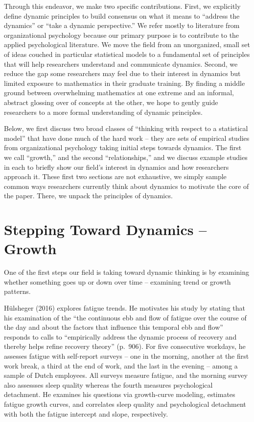 \documentclass[english,,man]{apa6}
\theoremstyle{definition}
\theoremstyle{definition}
\theoremstyle{definition}
\theoremstyle{remark}
\begin{document}
Through this endeavor, we make two specific contributions. First, we
explicitly define dynamic principles to build consensus on what it means
to \enquote{address the dynamics} or \enquote{take a dynamic
perspective.} We refer mostly to literature from organizational
psychology because our primary purpose is to contribute to the applied
psychological literature. We move the field from an unorganized, small
set of ideas couched in particular statistical models to a fundamental
set of principles that will help researchers understand and communicate
dynamics. Second, we reduce the gap some researchers may feel due to
their interest in dynamics but limited exposure to mathematics in their
graduate training. By finding a middle ground between overwhelming
mathematics at one extreme and an informal, abstract glossing over of
concepts at the other, we hope to gently guide researchers to a more
formal understanding of dynamic principles.

Below, we first discuss two broad classes of \enquote{thinking with
respect to a statistical model} that have done much of the hard work --
they are sets of empirical studies from organizational psychology taking
initial steps towards dynamics. The first we call \enquote{growth,} and
the second \enquote{relationships,} and we discuss example studies in
each to briefly show our field's interest in dynamics and how
researchers approach it. These first two sections are not exhaustive, we
simply sample common ways researchers currently think about dynamics to
motivate the core of the paper. There, we unpack the principles of
dynamics.

\hypertarget{stepping-toward-dynamics-growth}{%
\section{Stepping Toward Dynamics --
Growth}\label{stepping-toward-dynamics-growth}}

One of the first steps our field is taking toward dynamic thinking is by
examining whether something goes up or down over time -- examining trend
or growth patterns.

Hülsheger (2016) explores fatigue trends. He motivates his study by
stating that his examination of the \enquote{the continuous ebb and flow
of fatigue over the course of the day and about the factors that
influence this temporal ebb and flow} responds to calls to
\enquote{empirically address the dynamic process of recovery and thereby
helps refine recovery theory} (p.~906). For five consecutive workdays,
he assesses fatigue with self-report surveys -- one in the morning,
another at the first work break, a third at the end of work, and the
last in the evening -- among a sample of Dutch employees. All surveys
measure fatigue, and the morning survey also assessses sleep quality
whereas the fourth measures psychological detachment. He examines his
questions via growth-curve modeling, estimates fatigue growth curves,
and correlates sleep quality and psychological detachment with both the
fatigue intercept and slope, respectively.
\end{document}
